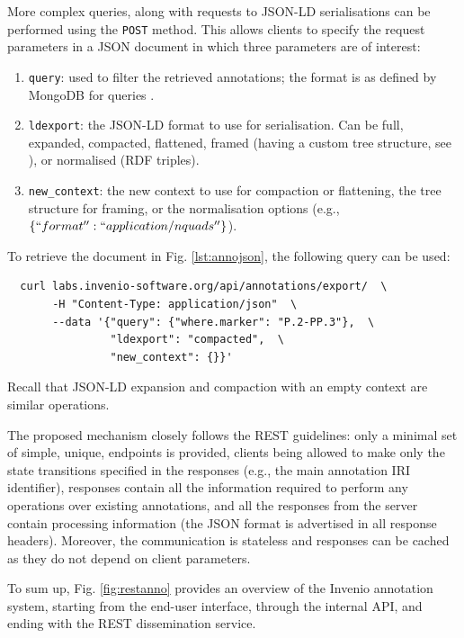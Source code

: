 More complex queries, along with requests to JSON-LD serialisations can be
performed using the \texttt{POST} method. This allows clients to specify the
request parameters in a JSON document in which three parameters are of interest:
\begin{enumerate}
  \item \texttt{query}: used to filter the retrieved annotations; the format is
                        as defined by MongoDB for queries \cite{ref:mongo}.
  \item \texttt{ldexport}: the JSON-LD format to use for serialisation. Can be
                           full, expanded, compacted, flattened, framed (having
                           a custom tree structure, see \cite{ref:jsonldframe}),
                           or normalised (RDF triples).
  \item \texttt{new\_context}: the new context to use for compaction or
                               flattening, the tree structure for framing, or
                               the normalisation options (e.g.,
                               $\{``format'': ``application/nquads''\}$).
\end{enumerate}

\newpage

To retrieve the document in Fig. \ref{lst:annojson}, the following
query can be used:
\begin{verbatim}
  curl labs.invenio-software.org/api/annotations/export/  \
       -H "Content-Type: application/json"  \
       --data '{"query": {"where.marker": "P.2-PP.3"},  \
                "ldexport": "compacted",  \
                "new_context": {}}'
\end{verbatim}
Recall that JSON-LD expansion and compaction with an empty context are similar
operations.

The proposed mechanism closely follows the REST guidelines: only a minimal set
of simple, unique, endpoints is provided, clients being allowed to make only
the state transitions specified in the responses (e.g., the main annotation IRI
identifier), responses contain all the information required to perform any
operations over existing annotations, and all the responses from the server
contain processing information (the JSON format is advertised in all response
headers). Moreover, the communication is stateless and responses can be cached
as they do not depend on client parameters.

To sum up, Fig. \ref{fig:restanno} provides an overview of the Invenio
annotation system, starting from the end-user interface, through the internal
API, and ending with the REST dissemination service.

